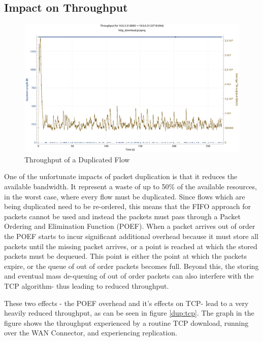 \subsection{Impact on Throughput}


\begin{figure}[h]
    \centering
        \includegraphics[height=0.66\textwidth,width=\textwidth]{fig/tcp_throughput.pdf}
        \caption{Throughput of a Duplicated Flow}
        \label{fig:dup_tcp}
\end{figure}

One of the unfortunate impacts of packet duplication is that it reduces the available bandwidth. It represent a waste of up to 50\% of the available resources, in the worst case, where every flow must be duplicated. Since flows which are being duplicated need to be re-ordered, this means that the FIFO approach for packets cannot be used and instead the packets must pass through a Packet Ordering and Elimination Function (POEF). When a packet arrives out of order the POEF starts to incur significant additional overhead because it must store all packets until the missing packet arrives, or a point is reached at which the stored packets must be dequeued. This point is either the point at which the packets expire, or the queue of out of order packets becomes full. Beyond this, the storing and eventual mass de-queuing of out of order packets can also interfere with the TCP algorithm- thus leading to reduced throughput.

These two effects - the POEF overhead and it's effects on TCP- lead to a very heavily reduced throughput, as can be seen in figure \ref{dup:tcp}. The graph in the figure shows the throughput experienced by a routine TCP download, running over the WAN Connector, and experiencing replication. 

